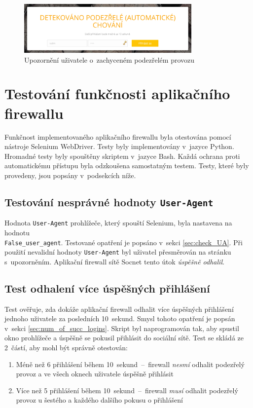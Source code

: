 \begin{figure}[H]
	\centering
	\includegraphics[width=0.8\textwidth]{images/bad_behaviour.jpg}
	\caption{Upozornění uživatele o~zachyceném podezřelém provozu}
	\label{img:bad_behaviour}
\end{figure}

\section{Testování funkčnosti aplikačního firewallu}
Funkčnost implementovaného aplikačního firewallu byla otestována pomocí nástroje Selenium WebDriver. Testy byly implementovány v~jazyce Python. Hromadné testy byly spouštěny skriptem v~jazyce Bash. Každá ochrana proti automatickému přístupu byla odzkoušena samostatným testem. Testy, které byly provedeny, jsou popsány v~podsekcích níže.

\subsection*{Testování nesprávné hodnoty \texttt{User-Agent}}
Hodnota \texttt{User-Agent} prohlížeče, který spouští Selenium, byla nastavena na hodnotu \\ \texttt{False\_user\_agent}. Testované opatření je popsáno v~sekci \ref{sec:check_UA}. Při použití nevalidní hodnoty \texttt{User-Agent} byl uživatel přesměrován na stránku s~upozorněním. Aplikační firewall sítě Socnet tento útok \textit{úspěšně odhalil}.

\subsection*{Test odhalení více úspěšných přihlášení}
Test ověřuje, zda dokáže aplikační firewall odhalit více úspěšných přihlášení jednoho uživatele za posledních 10~sekund. Smysl tohoto opatření je popsán v~sekci \ref{sec:num_of_succ_logins}. Skript byl naprogramován tak, aby spustil okno prohlížeče a úspěšně se pokusil přihlásit do sociální sítě. Test se skládá ze 2~částí, aby mohl být správně otestován:

\begin{enumerate}
  \item Méně než 6 přihlášení během 10~sekund~--~firewall \textit{nesmí} odhalit podezřelý provoz a ve všech oknech uživatele úspěšně přihlásit
  \item Více než 5 přihlášení během 10~sekund~--~firewall \textit{musí} odhalit podezřelý provoz u šestého a každého dalšího pokusu o přihlášení
\end{enumerate}


